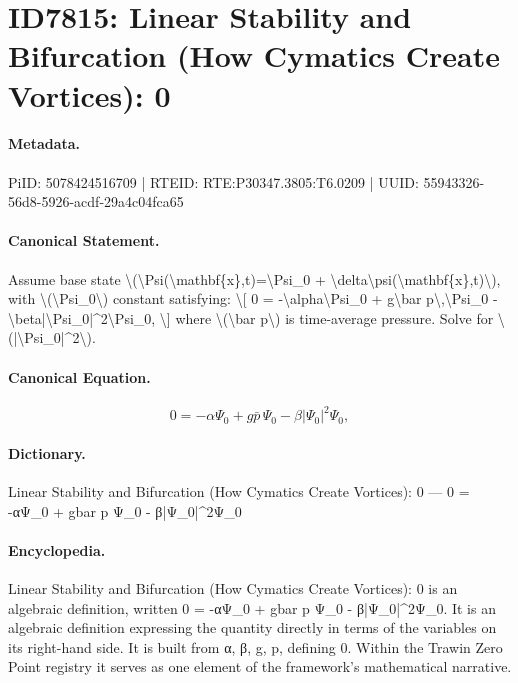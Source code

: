 \section*{ID7815: Linear Stability and Bifurcation (How Cymatics Create Vortices): 0}
\paragraph{Metadata.}
PiID: 5078424516709 | RTEID: RTE:P30347.3805:T6.0209 | UUID: 55943326-56d8-5926-acdf-29a4c04fca65

\paragraph{Canonical Statement.}
Assume base state \textbackslash{}(\textbackslash{}Psi(\textbackslash{}mathbf\{x\},t)=\textbackslash{}Psi\_0 + \textbackslash{}delta\textbackslash{}psi(\textbackslash{}mathbf\{x\},t)\textbackslash{}), with \textbackslash{}(\textbackslash{}Psi\_0\textbackslash{}) constant satisfying: \textbackslash{}[ 0 = -\textbackslash{}alpha\textbackslash{}Psi\_0 + g\textbackslash{}bar p\textbackslash{},\textbackslash{}Psi\_0 - \textbackslash{}beta|\textbackslash{}Psi\_0|\textasciicircum{}2\textbackslash{}Psi\_0, \textbackslash{}] where \textbackslash{}(\textbackslash{}bar p\textbackslash{}) is time-average pressure. Solve for \textbackslash{}(|\textbackslash{}Psi\_0|\textasciicircum{}2\textbackslash{}).

\paragraph{Canonical Equation.}
\[
0 = -\alpha\Psi_0 + g\bar p\,\Psi_0 - \beta|\Psi_0|^2\Psi_0,
\]

\paragraph{Dictionary.}
Linear Stability and Bifurcation (How Cymatics Create Vortices): 0 — 0 = -αΨ\_0 + gbar p Ψ\_0 - β|Ψ\_0|\textasciicircum{}2Ψ\_0

\paragraph{Encyclopedia.}
Linear Stability and Bifurcation (How Cymatics Create Vortices): 0 is an algebraic definition, written 0 = -αΨ\_0 + gbar p Ψ\_0 - β|Ψ\_0|\textasciicircum{}2Ψ\_0. It is an algebraic definition expressing the quantity directly in terms of the variables on its right-hand side. It is built from α, β, g, p, defining 0. Within the Trawin Zero Point registry it serves as one element of the framework's mathematical narrative.
